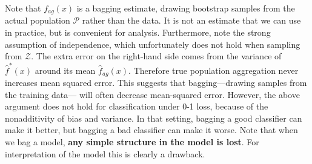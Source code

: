 \documentclass[twoside]{article}
\begin{document}
Note that
$f_{ag}(x)$ is a bagging estimate, drawing bootstrap samples from the actual population $\mathcal{P}$ rather than the data. It is not an estimate that we can use in practice, but is convenient for analysis. Furthermore, note the strong assumption of independence, which unfortunately does not hold when sampling from $\boldsymbol{\mathcal{Z}}$. The extra error on the right-hand side comes from the variance of $\hat{f}^*(x)$ around its mean $\hat{f}_{ag}(x)$. Therefore true population aggregation never increases mean squared error. This suggests that bagging—drawing samples
from the training data— will often decrease mean-squared error.
However, the above argument does not hold for classification under 0-1 loss, because of the nonadditivity of bias and variance. In that setting, bagging a good classifier can make it better, but bagging a bad classifier can make it worse. Note that when we bag a model, \textbf{any simple structure in the model is lost}. For interpretation of the model this is clearly a drawback. 
\end{document}
